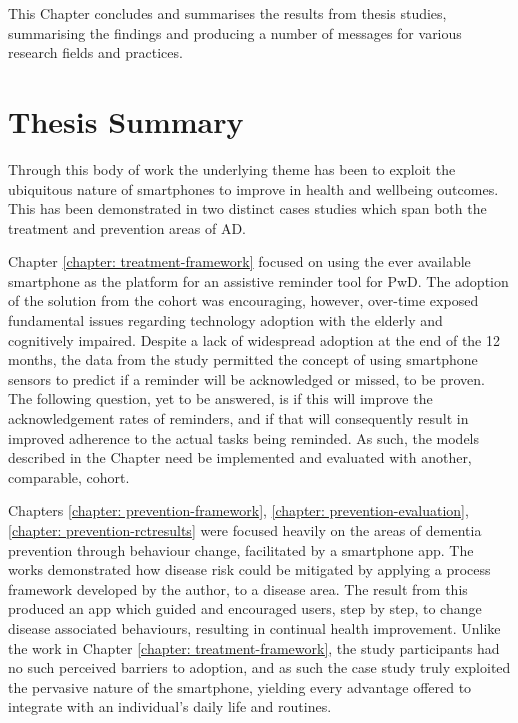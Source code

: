 \label{chapter: conclusion}

This Chapter concludes and summarises the results from thesis studies, summarising the findings and producing a number of messages for various research fields and practices.

\section{Thesis Summary}
Through this body of work the underlying theme has been to exploit the ubiquitous nature of smartphones to improve in health and wellbeing outcomes. This has been demonstrated in two distinct cases studies which span both the treatment and prevention areas of AD. 

Chapter \ref{chapter: treatment-framework} focused on using the ever available smartphone as the platform for an assistive reminder tool for PwD. The adoption of the solution from the cohort was encouraging, however, over-time exposed fundamental issues regarding technology adoption with the elderly and cognitively impaired. Despite a lack of widespread adoption at the end of the 12 months, the data from the study permitted the concept of using smartphone sensors to predict if a reminder will be acknowledged or missed, to be proven. The following question, yet to be answered, is if this will improve the acknowledgement rates of reminders, and if that will consequently result in improved adherence to the actual tasks being reminded. As such, the models described in the Chapter need be implemented and evaluated with another, comparable, cohort.

Chapters \ref{chapter: prevention-framework}, \ref{chapter: prevention-evaluation}, \ref{chapter: prevention-rctresults} were focused heavily on the areas of dementia prevention through behaviour change, facilitated by a smartphone app. The works demonstrated how disease risk could be mitigated by applying a process framework developed by the author, to a disease area. The result from this produced an app which guided and encouraged users, step by step, to change disease associated behaviours, resulting in continual health improvement. Unlike the work in Chapter \ref{chapter: treatment-framework}, the study participants had no such perceived barriers to adoption, and as such the case study truly exploited the pervasive nature of the smartphone, yielding every advantage offered to integrate with an individual’s daily life and routines. 
 
